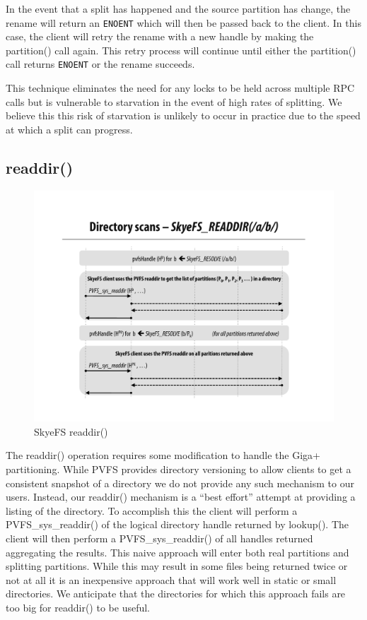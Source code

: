 \documentclass[letterpaper]{article}
\newcommand{\code}[1]{\texttt{#1}}
\begin{document}
In the event that a split has happened and the source partition has change, the
rename will return an \code{ENOENT} which will then be passed back to the client.  In
this case, the client will retry the rename with a new handle by making the
partition() call again.  This retry process will continue until either the
partition() call returns \code{ENOENT} or the rename succeeds.  

This technique eliminates the need for any locks to be held across multiple RPC
calls but is vulnerable to starvation in the event of high rates of splitting.
We believe this this risk of starvation is unlikely to occur in practice due to
the speed at which a split can progress.

\subsection{readdir()}
\begin{figure}
\begin{center}
\includegraphics[scale=0.4]{figure-readdir}
\end{center}
\caption{SkyeFS readdir()}
\end{figure}
The readdir() operation requires some modification to handle the Giga+
partitioning.  While PVFS provides directory versioning to allow clients to
get a consistent snapshot of a directory we do not provide any such mechanism
to our users.  Instead, our readdir() mechanism is a ``best effort'' attempt
at providing a listing of the directory.  To accomplish this the client will
perform a PVFS\_sys\_readdir() of the logical directory handle returned by
lookup().  The client will then perform a PVFS\_sys\_readdir() of all handles
returned aggregating the results.  This naive approach will enter both real
partitions and splitting partitions.  While this may result in some files
being returned twice or not at all it is an inexpensive approach that will
work well in static or small directories.  We anticipate that the directories
for which this approach fails are too big for readdir() to be useful.
\end{document}
